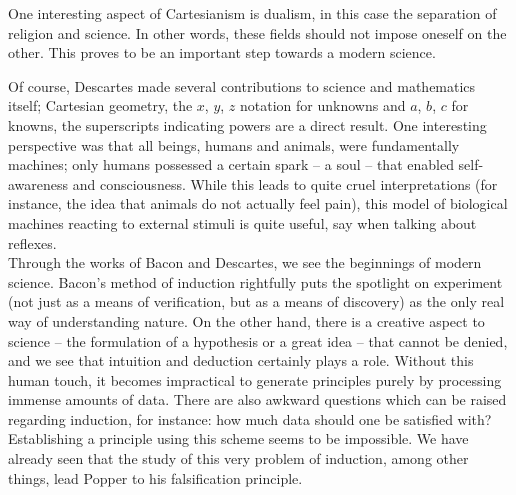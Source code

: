 \documentclass[11pt]{article}
\theoremstyle{remark}
\begin{document}
    One interesting aspect of Cartesianism is dualism, in this case the separation of
    religion and science. In other words, these fields should not impose oneself on
    the other. This proves to be an important step towards a modern science.

    Of course, Descartes made several contributions to science and mathematics
    itself; Cartesian geometry, the $x$, $y$, $z$ notation for unknowns and $a$, $b$,
    $c$ for knowns, the superscripts indicating powers are a direct result. One
    interesting perspective was that all beings, humans and animals, were
    fundamentally machines; only humans possessed a certain spark -- a soul -- that
    enabled self-awareness and consciousness. While this leads to quite cruel
    interpretations (for instance, the idea that animals do not actually feel pain),
    this model of biological machines reacting to external stimuli is quite useful,
    say when talking about reflexes. \\

    Through the works of Bacon and Descartes, we see the beginnings of modern
    science. Bacon's method of induction rightfully puts the spotlight on experiment
    (not just as a means of verification, but as a means of discovery) as the only
    real way of understanding nature. On the other hand, there is a creative aspect
    to science -- the formulation of a hypothesis or a great idea -- that cannot be
    denied, and we see that intuition and deduction certainly plays a role. Without
    this human touch, it becomes impractical to generate principles purely by
    processing immense amounts of data. There are also awkward questions which can be
    raised regarding induction, for instance: how much data should one be satisfied
    with? Establishing a principle using this scheme seems to be impossible. We have
    already seen that the study of this very problem of induction, among other
    things, lead Popper to his falsification principle.
\end{document}
